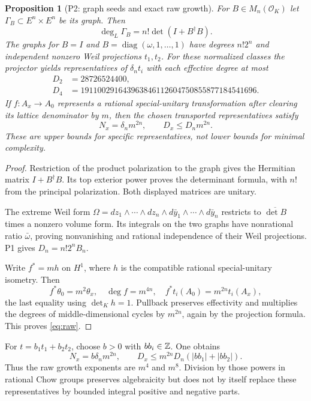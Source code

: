 \documentclass[11pt,a4paper]{article}
\newtheorem{proposition}[theorem]{Proposition}
\theoremstyle{definition}\newtheorem{definition}[theorem]{Definition}
\theoremstyle{remark}\newtheorem{remark}[theorem]{Remark}
\newcommand{\cO}{\mathcal O}\newcommand{\CH}{\operatorname{CH}}\newcommand{\cl}{\operatorname{cl}}
\begin{document}
\begin{proposition}[P2: graph seeds and exact raw growth]\label{P2}
For $B\in M_n(\cO_K)$ let $\Gamma_B\subset E^n\times E^n$ be its graph. Then
\[
 \deg_L\Gamma_B=n!\det(I+B^\dagger B).
\]
The graphs for $B=I$ and $B=\operatorname{diag}(\omega,1,\ldots,1)$ have degrees $n!2^n$ and independent nonzero Weil projections $t_1,t_2$. For these normalized classes the projector yields representatives of $\delta_nt_i$ with each effective degree at most
\begin{align*}
 D_2&=28726524400,\\
 D_4&=191100291643963846112604750855877184541696.
\end{align*}
If $f:A_x\to A_0$ represents a rational special-unitary transformation after clearing its lattice denominator by $m$, then the chosen transported representatives satisfy
\begin{equation}\label{eq:raw}
 N_x=\delta_nm^{2n},\qquad D_x\le D_nm^{2n}.
\end{equation}
These are upper bounds for specific representatives, not lower bounds for minimal complexity.
\end{proposition}
\begin{proof}
Restriction of the product polarization to the graph gives the Hermitian matrix $I+B^\dagger B$. Its top exterior power proves the determinant formula, with $n!$ from the principal polarization. Both displayed matrices are unitary.

The extreme Weil form
$\Omega=dz_1\wedge\cdots\wedge dz_n\wedge d\bar y_1\wedge\cdots\wedge d\bar y_n$
restricts to $\overline{\det B}$ times a nonzero volume form. Its integrals on the two graphs have nonrational ratio $\bar\omega$, proving nonvanishing and rational independence of their Weil projections. P1 gives $D_n=n!2^nB_n$.

Write $f^*=mh$ on $H^1$, where $h$ is the compatible rational special-unitary isometry. Then
\[
 f^*\theta_0=m^2\theta_x,\quad \deg f=m^{4n},\quad
 f^*t_i(A_0)=m^{2n}t_i(A_x),
\]
the last equality using $\det_Kh=1$. Pullback preserves effectivity and multiplies the degrees of middle-dimensional cycles by $m^{2n}$, again by the projection formula. This proves \eqref{eq:raw}.
\end{proof}

For $t=b_1t_1+b_2t_2$, choose $b>0$ with $bb_i\in\mathbb Z$. One obtains
\[
 N_x=b\delta_nm^{2n},\qquad
 D_x\le m^{2n}D_n(|bb_1|+|bb_2|).
\]
Thus the raw growth exponents are $m^4$ and $m^8$. Division by those powers in rational Chow groups preserves algebraicity but does not by itself replace these representatives by bounded integral positive and negative parts.
\end{document}
